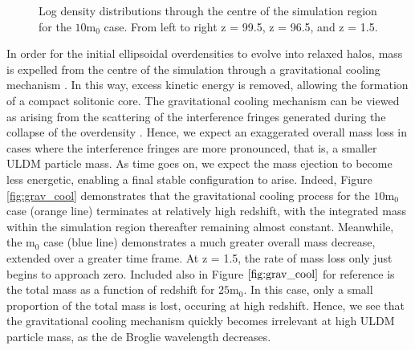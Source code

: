 \documentclass[a4paper,11pt]{article}
\begin{document}
\begin{figure}[!htb]
\endminipage
\caption{Log density distributions through the centre of the simulation region for the $10 \mathrm{m}_0$ case. From left to right z = 99.5, z = 96.5, and z = 1.5.}\label{fig:contours_mid}
\end{figure}


In order for the initial ellipsoidal overdensities to evolve into relaxed halos, mass is expelled from the centre of the simulation through a gravitational cooling mechanism \cite{Seidel:1993zk, Guzman:2006yc}. In this way, excess kinetic energy is removed, allowing the formation of a compact solitonic core. The gravitational cooling mechanism can be viewed as arising from the scattering of the interference fringes generated during the collapse of the overdensity \cite{Arvanitaki:2019rax}. Hence, we expect an exaggerated overall mass loss in cases where the interference fringes are more pronounced, that is, a smaller ULDM particle mass. As time goes on, we expect the mass ejection to become less energetic, enabling a final stable configuration to arise. Indeed, Figure \ref{fig:grav_cool} demonstrates that the gravitational cooling process for the $\mathrm{10m}_0$ case (orange line) terminates at relatively high redshift, with the integrated mass within the simulation region thereafter remaining almost constant. Meanwhile, the $\mathrm{m}_0$ case (blue line) demonstrates a much greater overall mass decrease, extended over a greater time frame. At z = 1.5, the rate of mass loss only just begins to approach zero. Included also in Figure $\ref{fig:grav_cool}$ for reference is the total mass as a function of redshift for $\mathrm{25m}_0$. In this case, only a small proportion of the total mass is lost, occuring at high redshift. Hence, we see that the gravitational cooling mechanism quickly becomes irrelevant at high ULDM particle mass, as the de Broglie wavelength decreases. 
\end{document}

